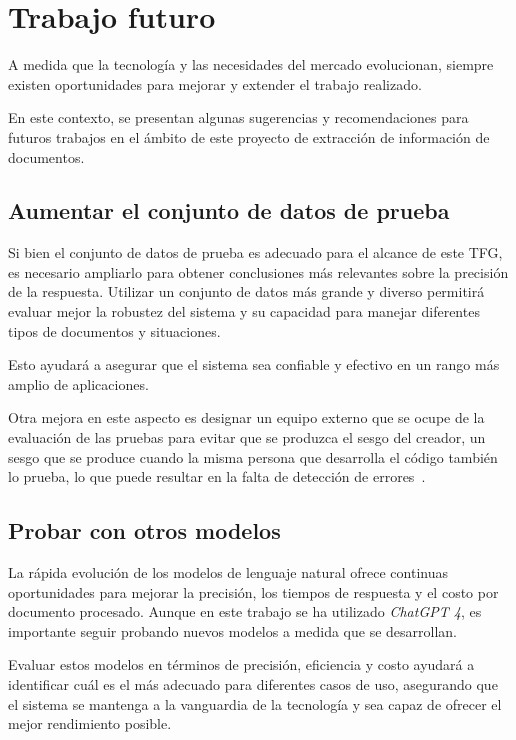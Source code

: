\section{Trabajo futuro}

A medida que la tecnología y las necesidades del mercado evolucionan, siempre existen oportunidades para mejorar y
extender el trabajo realizado.

En este contexto, se presentan algunas sugerencias y recomendaciones para futuros trabajos en el ámbito de este proyecto
de extracción de información de documentos.

\subsection{Aumentar el conjunto de datos de prueba}

Si bien el conjunto de datos de prueba es adecuado para el alcance de este TFG, es necesario ampliarlo para obtener
conclusiones más relevantes sobre la precisión de la respuesta.
Utilizar un conjunto de datos más grande y diverso permitirá evaluar mejor la robustez del sistema y su capacidad para
manejar diferentes tipos de documentos y situaciones.

Esto ayudará a asegurar que el sistema sea confiable y efectivo en un rango más amplio de aplicaciones.

Otra mejora en este aspecto es designar un equipo externo que se ocupe de la evaluación de las pruebas para evitar que
se produzca el sesgo del creador, un sesgo que se produce cuando la misma persona que desarrolla el código también lo
prueba, lo que puede resultar en la falta de detección de errores~\cite{url_test_io_bias_software_testing}.

\subsection{Probar con otros modelos}

La rápida evolución de los modelos de lenguaje natural ofrece continuas oportunidades para mejorar la precisión, los
tiempos de respuesta y el costo por documento procesado.
Aunque en este trabajo se ha utilizado \textit{ChatGPT 4}, es importante seguir probando nuevos modelos a medida que se
desarrollan.

Evaluar estos modelos en términos de precisión, eficiencia y costo ayudará a identificar cuál es el más adecuado para
diferentes casos de uso, asegurando que el sistema se mantenga a la vanguardia de la tecnología y sea capaz de ofrecer
el mejor rendimiento posible.

